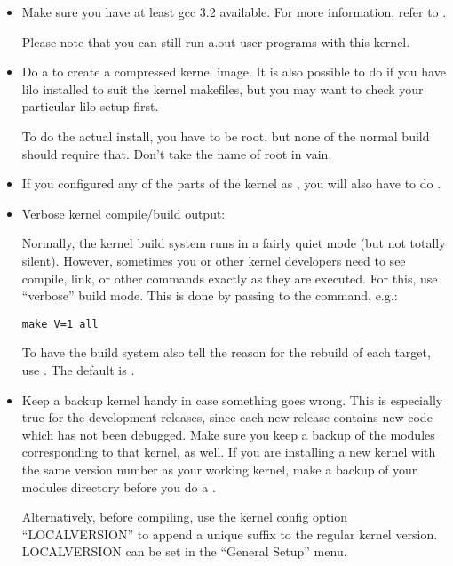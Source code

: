 \documentclass[a4paper,8pt,english]{sphinxmanual}
\begin{document}
\label{admin-guide/README:compiling-the-kernel}\begin{itemize}
\item {} 
Make sure you have at least gcc 3.2 available.
For more information, refer to .

Please note that you can still run a.out user programs with this kernel.

\item {} 
Do a  to create a compressed kernel image. It is also
possible to do  if you have lilo installed to suit the
kernel makefiles, but you may want to check your particular lilo setup first.

To do the actual install, you have to be root, but none of the normal
build should require that. Don't take the name of root in vain.

\item {} 
If you configured any of the parts of the kernel as , you
will also have to do .

\item {} 
Verbose kernel compile/build output:

Normally, the kernel build system runs in a fairly quiet mode (but not
totally silent).  However, sometimes you or other kernel developers need
to see compile, link, or other commands exactly as they are executed.
For this, use ``verbose'' build mode.  This is done by passing
 to the  command, e.g.:

\begin{Verbatim}[commandchars=\\\{\}]
make V=1 all
\end{Verbatim}

To have the build system also tell the reason for the rebuild of each
target, use .  The default is .

\item {} 
Keep a backup kernel handy in case something goes wrong.  This is
especially true for the development releases, since each new release
contains new code which has not been debugged.  Make sure you keep a
backup of the modules corresponding to that kernel, as well.  If you
are installing a new kernel with the same version number as your
working kernel, make a backup of your modules directory before you
do a .

Alternatively, before compiling, use the kernel config option
``LOCALVERSION'' to append a unique suffix to the regular kernel version.
LOCALVERSION can be set in the ``General Setup'' menu.


\end{itemize}
\end{document}
